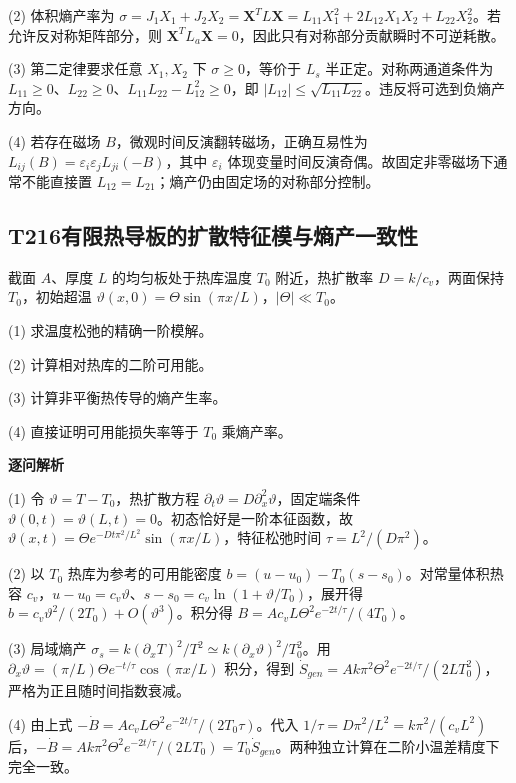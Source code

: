 (2) 体积熵产率为 $\sigma=J_1X_1+J_2X_2=\mathbf X^TL\mathbf X=L_{11}X_1^2+2L_{12}X_1X_2+L_{22}X_2^2$。若允许反对称矩阵部分，则 $\mathbf X^TL_a\mathbf X=0$，因此只有对称部分贡献瞬时不可逆耗散。

(3) 第二定律要求任意 $X_1,X_2$ 下 $\sigma\ge0$，等价于 $L_s$ 半正定。对称两通道条件为 $L_{11}\ge0$、$L_{22}\ge0$、$L_{11}L_{22}-L_{12}^2\ge0$，即 $|L_{12}|\le\sqrt{L_{11}L_{22}}$。违反将可选到负熵产方向。

(4) 若存在磁场 $B$，微观时间反演翻转磁场，正确互易性为 $L_{ij}(B)=\varepsilon_i\varepsilon_jL_{ji}(-B)$，其中 $\varepsilon_i$ 体现变量时间反演奇偶。故固定非零磁场下通常不能直接置 $L_{12}=L_{21}$；熵产仍由固定场的对称部分控制。

\par\medskip

\subsection*{T216\quad 有限热导板的扩散特征模与熵产一致性}

截面 $A$、厚度 $L$ 的均匀板处于热库温度 $T_0$ 附近，热扩散率 $D=k/c_v$，两面保持 $T_0$，初始超温 $\vartheta(x,0)=\Theta\sin(\pi x/L)$，$|\Theta|\ll T_0$。

(1) 求温度松弛的精确一阶模解。

(2) 计算相对热库的二阶可用能。

(3) 计算非平衡热传导的熵产生率。

(4) 直接证明可用能损失率等于 $T_0$ 乘熵产率。

\par\textbf{逐问解析}

(1) 令 $\vartheta=T-T_0$，热扩散方程 $\partial_t\vartheta=D\partial_x^2\vartheta$，固定端条件 $\vartheta(0,t)=\vartheta(L,t)=0$。初态恰好是一阶本征函数，故 $\vartheta(x,t)=\Theta e^{-Dt\pi^2/L^2}\sin(\pi x/L)$，特征松弛时间 $\tau=L^2/(D\pi^2)$。

(2) 以 $T_0$ 热库为参考的可用能密度 $b=(u-u_0)-T_0(s-s_0)$。对常量体积热容 $c_v$，$u-u_0=c_v\vartheta$、$s-s_0=c_v\ln(1+\vartheta/T_0)$，展开得 $b=c_v\vartheta^2/(2T_0)+O(\vartheta^3)$。积分得 $B=Ac_vL\Theta^2e^{-2t/\tau}/(4T_0)$。

(3) 局域熵产 $\sigma_s=k(\partial_xT)^2/T^2\simeq k(\partial_x\vartheta)^2/T_0^2$。用 $\partial_x\vartheta=(\pi/L)\Theta e^{-t/\tau}\cos(\pi x/L)$ 积分，得到 $\dot S_{gen}=Ak\pi^2\Theta^2 e^{-2t/\tau}/(2LT_0^2)$，严格为正且随时间指数衰减。

(4) 由上式 $-\dot B=Ac_vL\Theta^2e^{-2t/\tau}/(2T_0\tau)$。代入 $1/\tau=D\pi^2/L^2=k\pi^2/(c_vL^2)$ 后，$-\dot B=Ak\pi^2\Theta^2e^{-2t/\tau}/(2LT_0)=T_0\dot S_{gen}$。两种独立计算在二阶小温差精度下完全一致。

